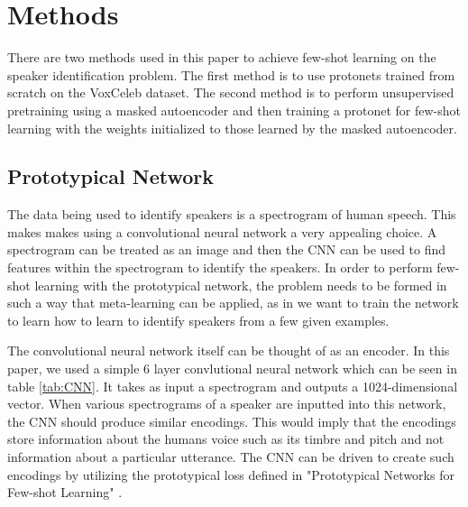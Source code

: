 \documentclass{article}
\begin{document}



\section{ Methods }
There are two methods used in this paper to achieve few-shot learning on the speaker identification problem. The first
method is to use protonets trained from scratch on the VoxCeleb dataset. The second method is to perform unsupervised
pretraining using a masked autoencoder and then training a protonet for few-shot learning with the weights initialized
to those learned by the masked autoencoder.

\subsection{Prototypical Network}
The data being used to identify speakers is a spectrogram of human speech. This makes makes using a convolutional neural network
a very appealing choice. A spectrogram can be treated as an image and then the CNN can be used to find features within
the spectrogram to identify the speakers. In order to perform few-shot learning with the prototypical network, the problem
needs to be formed in such a way that meta-learning can be applied, as in we want to train the network to learn how to learn
to identify speakers from a few given examples.

The convolutional neural network itself can be thought of as an encoder. In this paper, we used a simple 6 layer 
convlutional neural network which can be seen in table \ref{tab:CNN}. It takes as input a spectrogram and outputs a
1024-dimensional vector. When various spectrograms of a speaker are inputted into this network, the CNN should produce
similar encodings. This would imply that the encodings store information about the humans voice such as its timbre and 
pitch and not information about a particular utterance. The CNN can be driven to create such encodings by utilizing the
prototypical loss defined in "Prototypical Networks for Few-shot Learning" \cite[]{DBLP:journals/corr/SnellSZ17}.
\end{document}
